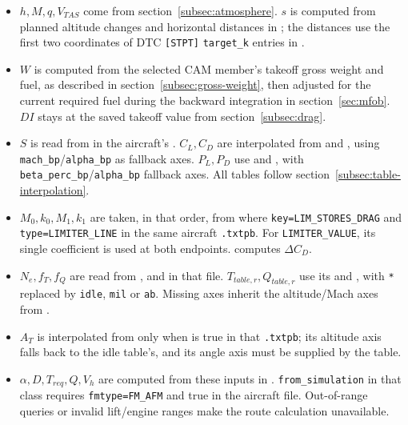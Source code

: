 \documentclass[10pt,a4paper]{amsart}
\begin{document}
\begin{itemize}
\setlength{\itemsep}{0pt}
\setlength{\parsep}{0pt}
\item $h,M,q,V_{TAS}$ come from section~\ref{subsec:atmosphere}.
$s$ is computed from planned altitude changes and horizontal distances
in ; the distances use the
first two coordinates of DTC \texttt{[STPT]} \texttt{target\_k} entries
in .
\item $W$ is computed from the selected CAM member's takeoff gross
weight and fuel, as described in section~\ref{subsec:gross-weight},
then adjusted for the current required fuel during the backward
integration in section~\ref{sec:mfob}. $DI$ stays at the saved takeoff
value from section~\ref{subsec:drag}.
\item $S$ is read from  in the aircraft's
. $C_L,C_D$ are interpolated from
 and , using
\texttt{mach\_bp}/\texttt{alpha\_bp} as fallback axes.
$P_L,P_D$ use  and
, with
\texttt{beta\_perc\_bp}/\texttt{alpha\_bp} fallback axes.
All tables follow section~\ref{subsec:table-interpolation}.
\item $M_0,k_0,M_1,k_1$ are taken, in that order, from
 where \texttt{key=LIM\_STORES\_DRAG}
and \texttt{type=LIMITER\_LINE} in the same aircraft \texttt{.txtpb}.
For \texttt{LIMITER\_VALUE}, its single coefficient is used at both
endpoints.  computes $\Delta C_D$.
\item $N_e,f_T,f_Q$ are read from ,
 and 
in that file. $T_{table,r},Q_{table,r}$ use its
 and
, with \texttt{*} replaced by
\texttt{idle}, \texttt{mil} or \texttt{ab}. Missing axes inherit the
altitude/Mach axes from .
\item $A_T$ is interpolated from
 only when
 is true in that \texttt{.txtpb};
its altitude axis falls back to the idle table's, and its angle axis
must be supplied by the table.
\item $\alpha,D,T_{req},Q,V_h$ are computed from these inputs in
.
\texttt{from\_simulation} in that class requires
\texttt{fmtype=FM\_AFM} and  true in the
aircraft file. Out-of-range queries or invalid lift/engine ranges
make the route calculation unavailable.
\end{itemize}
\end{document}
